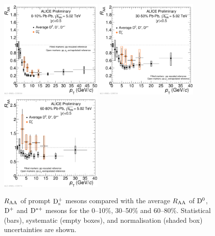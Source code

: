 \begin{figure}[!h]
\centering
\includegraphics[angle=0, width=0.45\textwidth]{FigCap5/DmesonAverageDs_010.pdf}
\includegraphics[angle=0, width=0.45\textwidth]{FigCap5/DmesonAverageDs_3050.pdf}
\includegraphics[angle=0, width=0.45\textwidth]{FigCap5/DmesonAverageDs_6080.pdf}
 \caption{$R_{\rm AA}$ 
  of prompt ${\rm D_s^+}$ mesons 
  compared with the average $R_{\rm AA}$ of ${\rm D^0}$, ${\rm D^+}$ and ${\rm D^{*+}}$ mesons for the 
0--10\%, 30--50\% and 60--80\%. 
Statistical (bars),  systematic (empty boxes), and normalisation (shaded box) 
uncertainties are shown.}
 \label{fig:DmesRaa} 
\end{figure} 


